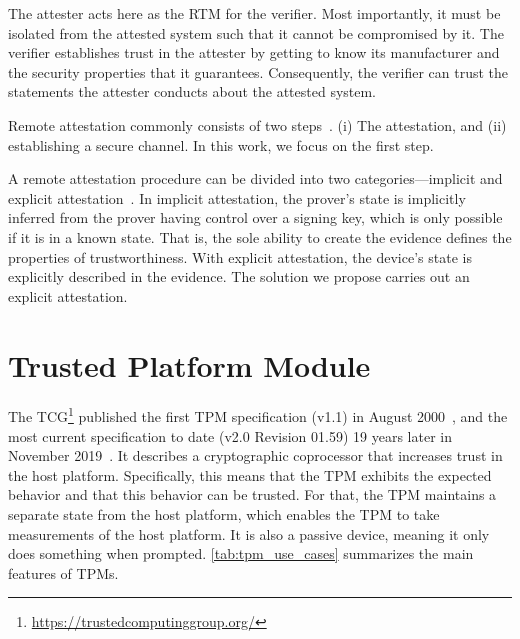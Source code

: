 The attester acts here as the \ac{RTM} for the verifier.
Most importantly, it must be isolated from the attested system such that it cannot be compromised by it.
The verifier establishes trust in the attester by getting to know its manufacturer and the security properties that it guarantees.
Consequently, the verifier can trust the statements the attester conducts about the attested system.

Remote attestation commonly consists of two steps~\cite{McCune2008}.
(i) The attestation, and (ii) establishing a secure channel.
In this work, we focus on the first step.

A remote attestation procedure can be divided into two categories---implicit and explicit attestation~\cite{dice-layering-arch}.
In implicit attestation, the prover's state is implicitly inferred from the prover having control over a signing key, which is only possible if it is in a known state.
That is, the sole ability to create the evidence defines the properties of trustworthiness.
With explicit attestation, the device's state is explicitly described in the evidence.
The solution we propose carries out an explicit attestation.

\section{Trusted Platform Module}\label{sec:tpm}

The \ac{TCG}\footnote{\url{https://trustedcomputinggroup.org/}} published the first TPM specification (v1.1) in August 2000~\cite{tpm11}, and the most current specification to date (v2.0 Revision 01.59) 19 years later in November 2019~\cite{tpm20}.
It describes a cryptographic coprocessor that increases trust in the host platform.
Specifically, this means that the TPM exhibits the expected behavior and that this behavior can be trusted.
For that, the TPM maintains a separate state from the host platform, which enables the TPM to take measurements of the host platform.
It is also a passive device, meaning it only does something when prompted.
\autoref{tab:tpm_use_cases} summarizes the main features of TPMs.



